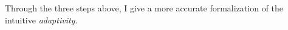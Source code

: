 Through the three steps above, I give a more accurate formalization of the intuitive \emph{adaptivity}.

